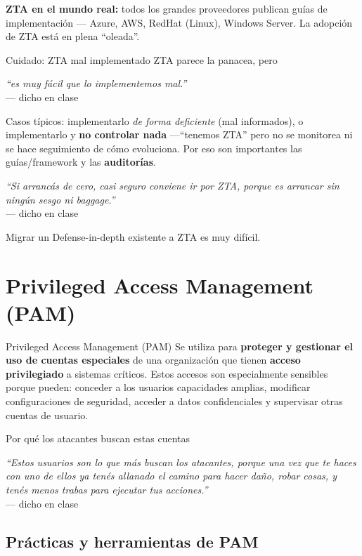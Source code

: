 \documentclass[11pt,a4paper]{article}
\newcommand{\prof}[1]{\par\medskip\noindent\textit{``#1''}\\[-2pt]\hspace*{1em}%
  {\footnotesize\textcolor{black!60}{--- dicho en clase}}\par\medskip\noindent}
\begin{document}
\begin{slidebox}
\textbf{ZTA en el mundo real:} todos los grandes proveedores publican guías de implementación —
Azure, AWS, RedHat (Linux), Windows Server. La adopción de ZTA está en plena ``oleada''.
\end{slidebox}

\begin{warnbox}{Cuidado: ZTA mal implementado}
ZTA parece la panacea, pero \prof{es muy fácil que lo implementemos mal.} Casos típicos:
implementarlo \emph{de forma deficiente} (mal informados), o implementarlo y \textbf{no
controlar nada} —``tenemos ZTA'' pero no se monitorea ni se hace seguimiento de cómo evoluciona.
Por eso son importantes las guías/framework y las \textbf{auditorías}.
\prof{Si arrancás de cero, casi seguro conviene ir por ZTA, porque es arrancar sin ningún sesgo
ni \emph{baggage}.} Migrar un Defense-in-depth existente a ZTA es muy difícil.
\end{warnbox}

\section{Privileged Access Management (PAM)}

\begin{defbox}{Privileged Access Management (PAM)}
Se utiliza para \textbf{proteger y gestionar el uso de cuentas especiales} de una organización
que tienen \textbf{acceso privilegiado} a sistemas críticos. Estos accesos son especialmente
sensibles porque pueden: conceder a los usuarios capacidades amplias, modificar configuraciones
de seguridad, acceder a datos confidenciales y supervisar otras cuentas de usuario.
\end{defbox}

\begin{anecbox}{Por qué los atacantes buscan estas cuentas}
\prof{Estos usuarios son lo que más buscan los atacantes, porque una vez que te haces con uno de
ellos ya tenés allanado el camino para hacer daño, robar cosas, y tenés menos trabas para
ejecutar tus acciones.}
\end{anecbox}

\subsection{Prácticas y herramientas de PAM}
\end{document}
